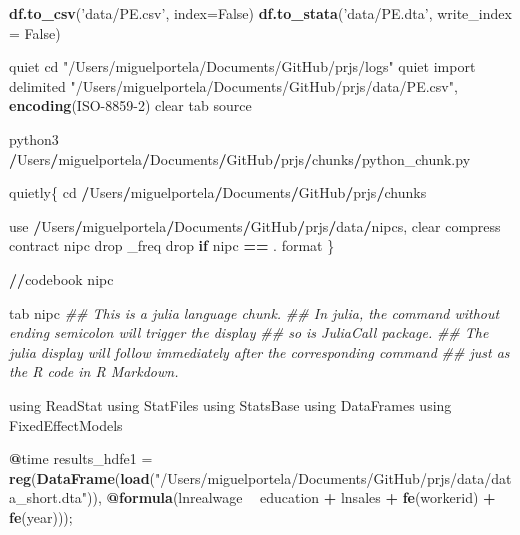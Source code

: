 \documentclass[
  12pt,
]{article}
\newenvironment{Shaded}{\begin{snugshade}}{\end{snugshade}}
\newcommand{\CommentTok}[1]{\textcolor[rgb]{0.56,0.35,0.01}{\textit{#1}}}
\newcommand{\ControlFlowTok}[1]{\textcolor[rgb]{0.13,0.29,0.53}{\textbf{#1}}}
\newcommand{\DataTypeTok}[1]{\textcolor[rgb]{0.13,0.29,0.53}{#1}}
\newcommand{\DecValTok}[1]{\textcolor[rgb]{0.00,0.00,0.81}{#1}}
\newcommand{\ErrorTok}[1]{\textcolor[rgb]{0.64,0.00,0.00}{\textbf{#1}}}
\newcommand{\FloatTok}[1]{\textcolor[rgb]{0.00,0.00,0.81}{#1}}
\newcommand{\KeywordTok}[1]{\textcolor[rgb]{0.13,0.29,0.53}{\textbf{#1}}}
\newcommand{\NormalTok}[1]{#1}
\newcommand{\OperatorTok}[1]{\textcolor[rgb]{0.81,0.36,0.00}{\textbf{#1}}}
\newcommand{\StringTok}[1]{\textcolor[rgb]{0.31,0.60,0.02}{#1}}
\begin{document}
\begin{Shaded}
\begin{Highlighting}[]
\KeywordTok{df.to_csv}\NormalTok{(}\StringTok{'data/PE.csv'}\NormalTok{, }\DataTypeTok{index=}\NormalTok{False)}
\KeywordTok{df.to_stata}\NormalTok{(}\StringTok{'data/PE.dta'}\NormalTok{, }\DataTypeTok{write_index =}\NormalTok{ False)}


\NormalTok{quiet cd }\StringTok{"/Users/miguelportela/Documents/GitHub/prjs/logs"}
\NormalTok{quiet import delimited }\StringTok{"/Users/miguelportela/Documents/GitHub/prjs/data/PE.csv"}\NormalTok{, }\KeywordTok{encoding}\NormalTok{(ISO}\DecValTok{-8859-2}\NormalTok{) clear}
\NormalTok{tab source}

\NormalTok{python3 }\OperatorTok{/}\NormalTok{Users}\OperatorTok{/}\NormalTok{miguelportela}\OperatorTok{/}\NormalTok{Documents}\OperatorTok{/}\NormalTok{GitHub}\OperatorTok{/}\NormalTok{prjs}\OperatorTok{/}\NormalTok{chunks}\OperatorTok{/}\NormalTok{python_chunk.py}

\NormalTok{quietly\{}
\NormalTok{cd }\OperatorTok{/}\NormalTok{Users}\OperatorTok{/}\NormalTok{miguelportela}\OperatorTok{/}\NormalTok{Documents}\OperatorTok{/}\NormalTok{GitHub}\OperatorTok{/}\NormalTok{prjs}\OperatorTok{/}\NormalTok{chunks}

\NormalTok{use }\OperatorTok{/}\NormalTok{Users}\OperatorTok{/}\NormalTok{miguelportela}\OperatorTok{/}\NormalTok{Documents}\OperatorTok{/}\NormalTok{GitHub}\OperatorTok{/}\NormalTok{prjs}\OperatorTok{/}\NormalTok{data}\OperatorTok{/}\NormalTok{nipcs, clear}
\NormalTok{compress}
\NormalTok{contract nipc}
\NormalTok{drop _freq}
\NormalTok{drop }\ControlFlowTok{if}\NormalTok{ nipc }\OperatorTok{==}\StringTok{ }\NormalTok{.}
\NormalTok{format %
\NormalTok{\}}

\OperatorTok{/}\ErrorTok{/}\NormalTok{codebook nipc}

\NormalTok{tab nipc}
\CommentTok{## This is a julia language chunk.}
\CommentTok{## In julia, the command without ending semicolon will trigger the display}
\CommentTok{## so is JuliaCall package.}
\CommentTok{## The julia display will follow immediately after the corresponding command}
\CommentTok{## just as the R code in R Markdown.}

\NormalTok{using ReadStat}
\NormalTok{using StatFiles}
\NormalTok{using StatsBase}
\NormalTok{using DataFrames}
\NormalTok{using FixedEffectModels}

\OperatorTok{@}\NormalTok{time results_hdfe1 =}\StringTok{ }\KeywordTok{reg}\NormalTok{(}\KeywordTok{DataFrame}\NormalTok{(}\KeywordTok{load}\NormalTok{(}\StringTok{"/Users/miguelportela/Documents/GitHub/prjs/data/data_short.dta"}\NormalTok{)), }\OperatorTok{@}\KeywordTok{formula}\NormalTok{(lnrealwage }\OperatorTok{~}\StringTok{ }\NormalTok{education }\OperatorTok{+}\StringTok{ }\NormalTok{lnsales }\OperatorTok{+}\StringTok{ }\KeywordTok{fe}\NormalTok{(workerid) }\OperatorTok{+}\StringTok{ }\KeywordTok{fe}\NormalTok{(year)));}

}
\end{Highlighting}
\end{Shaded}
\end{document}
